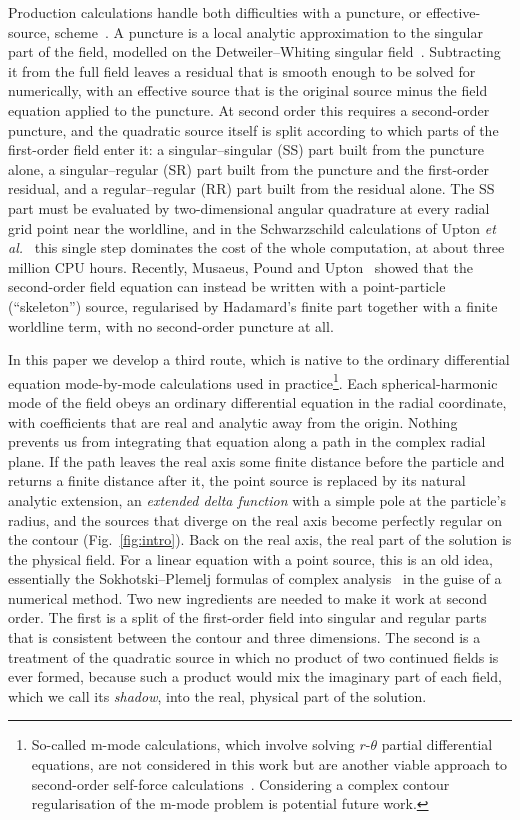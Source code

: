 \documentclass[aps,prd,twocolumn,superscriptaddress,nofootinbib,floatfix]{revtex4-2}
\begin{document}
Production calculations handle both difficulties with a puncture, or effective-source, scheme~\cite{BarackGolbourn2007,VegaDetweiler2008,WardellWarburton2015,PoundMiller2014,Upton2026}.
A puncture is a local analytic approximation to the singular part of the field, modelled on the Detweiler--Whiting singular field~\cite{DetweilerWhiting2003}.
Subtracting it from the full field leaves a residual that is smooth enough to be solved for numerically, with an effective source that is the original source minus the field equation applied to the puncture.
At second order this requires a second-order puncture, and the quadratic source itself is split according to which parts of the first-order field enter it: a singular--singular (SS) part built from the puncture alone, a singular--regular (SR) part built from the puncture and the first-order residual, and a regular--regular (RR) part built from the residual alone.
The SS part must be evaluated by two-dimensional angular quadrature at every radial grid point near the worldline, and in the Schwarzschild calculations of Upton \emph{et al.}~\cite{Upton2026} this single step dominates the cost of the whole computation, at about three million CPU hours.
Recently, Musaeus, Pound and Upton~\cite{MusaeusPoundUpton2026} showed that the second-order field equation can instead be written with a point-particle (``skeleton'') source, regularised by Hadamard's finite part together with a finite worldline term, with no second-order puncture at all.

In this paper we develop a third route, which is native to the ordinary differential equation mode-by-mode calculations used in practice\footnote{So-called m-mode calculations, which involve solving $r$-$\theta$ partial differential equations, are not considered in this work but are another viable approach to second-order self-force calculations~\cite{}. Considering a complex contour regularisation of the m-mode problem is potential future work.}.
Each spherical-harmonic mode of the field obeys an ordinary differential equation in the radial coordinate, with coefficients that are real and analytic away from the origin.
Nothing prevents us from integrating that equation along a path in the complex radial plane.
If the path leaves the real axis some finite distance before the particle and returns a finite distance after it, the point source is replaced by its natural analytic extension, an \emph{extended delta function} with a simple pole at the particle's radius, and the sources that diverge on the real axis become perfectly regular on the contour (Fig.~\ref{fig:intro}).
Back on the real axis, the real part of the solution is the physical field.
For a linear equation with a point source, this is an old idea, essentially the Sokhotski--Plemelj formulas of complex analysis~\cite{Muskhelishvili1953} in the guise of a numerical method.
Two new ingredients are needed to make it work at second order.
The first is a split of the first-order field into singular and regular parts that is consistent between the contour and three dimensions.
The second is a treatment of the quadratic source in which no product of two continued fields is ever formed, because such a product would mix the imaginary part of each field, which we call its \emph{shadow}, into the real, physical part of the solution.
\end{document}
